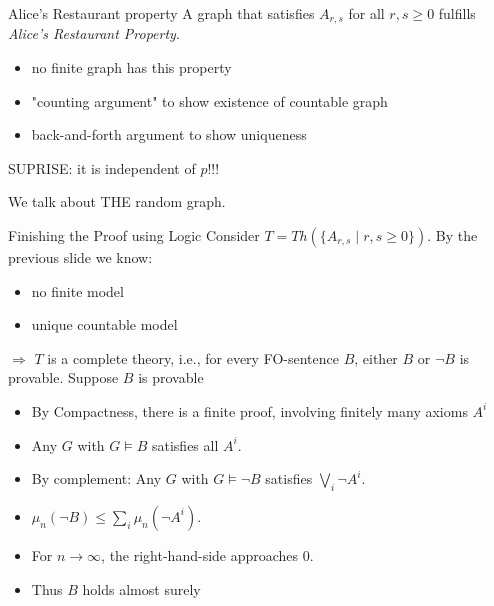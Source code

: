 \documentclass[draft]{beamer}
\begin{document}
\begin{frame}{Alice's Restaurant property}
  A graph that satisfies $A_{r,s}$ for all $r,s\geq 0$ fulfills \emph{Alice's Restaurant Property}.

  \begin{itemize}
    \item no finite graph has this property
    \item "counting argument" to show existence of countable graph
    \item back-and-forth argument to show uniqueness

  \end{itemize}

\pause
\bigskip
  SUPRISE: it is independent of $p$!!!

\pause
  We talk about THE random graph.
\end{frame}



\begin{frame}{Finishing the Proof using Logic}
  Consider $T=Th(\{A_{r,s}\mid r,s\geq 0\})$. By the previous slide we know: 
  \begin{itemize}
    \item no finite model
    \item unique countable model
  \end{itemize}
  $\Rightarrow$ $T$ is a complete theory, \mbox{i.e.}, for every FO-sentence $B$, either $B$ or $\neg B$ is provable. Suppose $B$ is provable
  \begin{itemize}[<+->]
    \item By Compactness, there is a finite proof, involving finitely many axioms $A^i$
    \item Any $G$ with $G\models B$ satisfies all $A^i$. 
    \item By complement: Any $G$ with $G\models \neg B$ satisfies $\bigvee_i\neg A^i$.
    \item $\mu_n(\neg B)\leq \sum_i\mu_n(\neg A^i)$. 
    \item For $n\rightarrow\infty$, the right-hand-side approaches $0$.
    \item Thus $B$ holds almost surely
  \end{itemize}
\end{frame}
\end{document}
